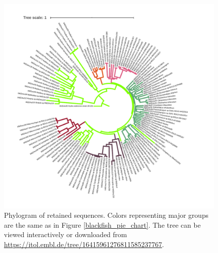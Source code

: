 \begin{figure}[H]
\begin{center}
\includegraphics[width=\textwidth]{img/blackfish_phylo.pdf}
\caption{Phylogram of retained  sequences. Colors representing major groups are the same as in Figure \ref{blackfish_pie_chart}. The tree can be viewed interactively or downloaded from \url{https://itol.embl.de/tree/16415961276811585237767}.}
\label{blackfish_phylo}
\end{center}
\end{figure} 

